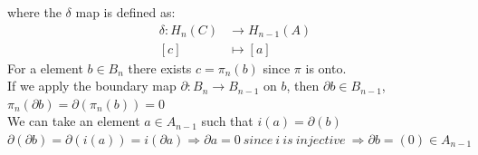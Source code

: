 \documentclass[11pt,a4paper]{report}
\begin{document}
%
                where the $\delta$ map is defined as:
                \begin{align*}
                  \delta: H_n(C) &\rightarrow H_{n-1}(A)\\
                  [c] &\mapsto [a]
                \end{align*}
                For a element $b \in B_n$ there exists $c = \pi_n(b)$ since $\pi$ is onto. \\
                If we apply the boundary map $\partial: B_{n} \rightarrow B_{n-1}$ on $b$, then
                $\partial b \in B_{n-1}$,  $\pi_n(\partial b) = \partial(\pi_n(b)) = 0$\\
                We can take an element $a \in A_{n-1}$ such that $i(a) = \partial(b)$\\
                $
                  \partial (\partial b) = \partial (i(a)) = i(\partial a) \Rightarrow \partial a = 0\ since\ i\ is\ injective \ \Rightarrow \partial b = (0) \in A_{n-1}
                $
\end{document}
